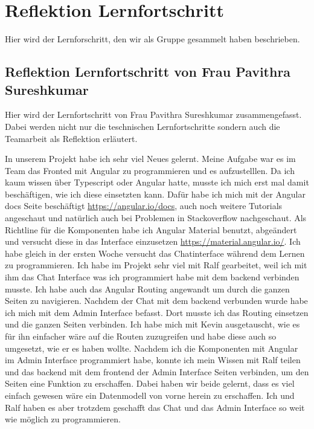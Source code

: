 \section{Reflektion Lernfortschritt}
Hier wird der Lernforschritt, den wir als Gruppe gesammelt haben beschrieben.

\subsection{Reflektion Lernfortschritt von Frau Pavithra Sureshkumar}
Hier wird der Lernfortschritt von Frau Pavithra Sureshkumar zusammengefasst. Dabei werden nicht nur die teschnischen Lernfortschritte sondern auch die Teamarbeit als Reflektion erläutert.\newline

\noindent In unserem Projekt habe ich sehr viel Neues gelernt. Meine Aufgabe war es im Team das Fronted mit Angular zu programmieren und es aufzustelllen.
Da ich kaum wissen über Typescript oder Angular hatte, musste ich mich erst mal damit beschäftigen, wie ich diese einsetzten kann. Dafür habe ich mich mit der 
Angular docs Seite beschäftigt \href{https://angular.io/docs}{https://angular.io/docs}, auch noch weitere Tutorials angeschaut und natürlich auch bei Problemen in Stackoverflow nachgeschaut. Als Richtline für die Komponenten habe ich Angular Material benutzt, 
abgeändert und versucht diese in das Interface einzusetzen \href{https://material.angular.io/}{https://material.angular.io/}. 
Ich habe gleich in der ersten Woche versucht das Chatinterface während dem Lernen zu programmieren.
Ich habe im Projekt sehr viel mit Ralf gearbeitet, weil ich mit ihm das Chat Interface was ich programmiert habe mit dem backend verbinden musste. Ich habe auch das Angular Routing angewandt um durch die ganzen
Seiten zu navigieren. Nachdem der Chat mit dem backend verbunden wurde habe ich mich mit dem Admin Interface befasst. Dort musste ich das Routing einsetzen und die ganzen Seiten verbinden.
Ich habe mich mit Kevin ausgetauscht, wie es für ihn einfacher wäre auf die Routen zuzugreifen und habe diese auch so umgesetzt, wie er es haben wollte.
Nachdem ich die Komponenten mit Angular im Admin Interface programmiert habe, konnte ich mein Wissen mit Ralf teilen und das backend mit dem frontend der Admin Interface Seiten verbinden, um den Seiten eine Funktion zu erschaffen.
Dabei haben wir beide gelernt, dass es viel einfach gewesen wäre ein Datenmodell von vorne herein zu erschaffen. Ich und Ralf haben es aber trotzdem geschafft das Chat und das Admin Interface so weit wie möglich zu programmieren.
